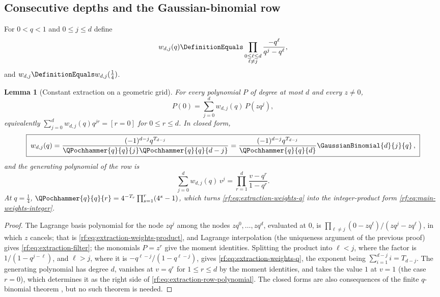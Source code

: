 \documentclass[11pt,oneside]{article}
\theoremstyle{plain}
\newtheorem{lemma}[theorem]{Lemma}
\theoremstyle{definition}
\theoremstyle{remark}
\newcommand{\qb}[3]{\GaussianBinomial{#1}{#2}{#3}}
\newcommand{\qp}[3]{\QPochhammer{#1}{#2}{#3}}
\newcommand{\Tr}[1]{T_{#1}}                 %
\begin{document}
\subsection{Consecutive depths and the Gaussian-binomial row}
\label{rf:sec:extraction-row}

For $0<q<1$ and $0\le j\le d$ define
\begin{equation}
 w_{d,j}(q)\DefinitionEquals
 \prod_{\substack{0\le\ell\le d\\ \ell\neq j}}\frac{-q^{\ell}}{q^{j}-q^{\ell}},
 \label{rf:eq:extraction-weights-product}
\end{equation}
and $w_{d,j}\DefinitionEquals w_{d,j}(\tfrac14)$.

\begin{lemma}[Constant extraction on a geometric grid]
\label{rf:lem:extraction-weights}
For every polynomial $P$ of degree at most $d$ and every $z\neq0$,
\begin{equation}
 P(0)=\sum_{j=0}^{d}w_{d,j}(q)\,P(zq^{j}),
 \label{rf:eq:extraction-filter}
\end{equation}
equivalently $\sum_{j=0}^{d}w_{d,j}(q)q^{jr}=[r=0]$ for $0\le r\le d$.  In
closed form,
\begin{equation}
 \boxed{\;
 w_{d,j}(q)=\frac{(-1)^{d-j}q^{\Tr{d-j}}}{\qp{q}{q}{j}\qp{q}{q}{d-j}}
 =\frac{(-1)^{d-j}q^{\Tr{d-j}}}{\qp{q}{q}{d}}\qb{d}{j}{q}\,,\;}
 \label{rf:eq:extraction-weights-q}
\end{equation}
and the generating polynomial of the row is
\begin{equation}
 \sum_{j=0}^{d}w_{d,j}(q)\,v^{j}=\prod_{r=1}^{d}\frac{v-q^{r}}{1-q^{r}}.
 \label{rf:eq:extraction-row-polynomial}
\end{equation}
At $q=\tfrac14$, $\qp{q}{q}{r}=4^{-\Tr{r}}\prod_{s=1}^{r}(4^{s}-1)$, which
turns \cref{rf:eq:extraction-weights-q} into the integer-product form
\cref{rf:eq:main-weights-integer}.
\end{lemma}

\begin{proof}
The Lagrange basis polynomial for the node $zq^{j}$ among the nodes
$zq^{0},\ldots,zq^{d}$, evaluated at $0$, is
$\prod_{\ell\neq j}(0-zq^{\ell})/(zq^{j}-zq^{\ell})$, in which $z$ cancels;
that is \cref{rf:eq:extraction-weights-product}, and Lagrange interpolation
(the uniqueness argument of the previous proof) gives
\cref{rf:eq:extraction-filter}; the monomials $P=z^{r}$ give the moment
identities.  Splitting the product into $\ell<j$, where the factor is
$1/(1-q^{j-\ell})$, and $\ell>j$, where it is $-q^{\ell-j}/(1-q^{\ell-j})$,
gives \cref{rf:eq:extraction-weights-q}, the exponent being
$\sum_{i=1}^{d-j}i=\Tr{d-j}$.  The generating polynomial has degree $d$,
vanishes at $v=q^{r}$ for $1\le r\le d$ by the moment identities, and takes
the value $1$ at $v=1$ (the case $r=0$), which determines it as the right
side of \cref{rf:eq:extraction-row-polynomial}.  The closed forms are also
consequences of the finite $q$-binomial theorem \cite[\S17.2]{dlmf}, but no
such theorem is needed.
\end{proof}
\end{document}
